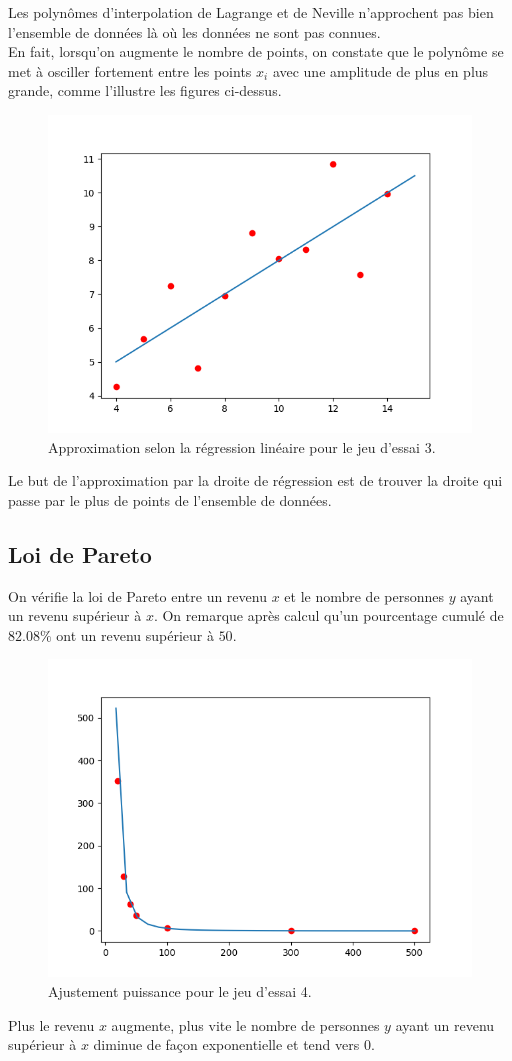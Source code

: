 \documentclass[12pt,french,titlepage]{article}
\begin{document}
Les polynômes d'interpolation de Lagrange et de Neville n'approchent pas bien l'ensemble de données là où les données ne sont pas connues.\\
En fait, lorsqu'on augmente le nombre de points, on constate que le polynôme se met à osciller fortement entre les points $x_i$ avec une amplitude de plus en plus grande, comme l'illustre les figures ci-dessus.
		\begin{figure}[H]
		\includegraphics[width=\textwidth]{"33.png"}
		\caption{Approximation selon la régression linéaire pour le jeu d'essai 3.}
		\end{figure}
Le but de l'approximation par la droite de régression est de trouver la droite qui passe par le plus de points de l'ensemble de données.
	\subsection{Loi de Pareto}
On vérifie la loi de Pareto entre un revenu $x$ et le nombre de personnes $y$ ayant un revenu supérieur à $x$. On remarque après calcul qu'un pourcentage cumulé de $82.08\%$ ont un revenu supérieur à $50$.
		\begin{figure}[H]
		\includegraphics[width=\textwidth]{"4.png"}
		\caption{Ajustement puissance pour le jeu d'essai 4.}
		\end{figure}
Plus le revenu $x$ augmente, plus vite le nombre de personnes $y$ ayant un revenu supérieur à $x$ diminue de façon exponentielle et tend vers $0$.
\end{document}
